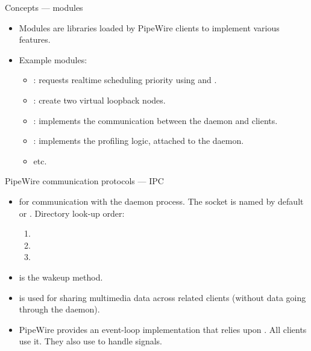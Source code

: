 \begin{frame}{Concepts — modules}
  \begin{itemize}

  \item Modules are libraries loaded by PipeWire clients to implement
    various features.

  \item Example modules:

    \begin{itemize}
    \item {}: requests realtime scheduling priority using
       and .
    \item {}: create two virtual loopback nodes.
    \item {}: implements the communication
      between the daemon and clients.
    \item {}: implements the profiling logic,
      attached to the daemon.
    \item etc.
    \end{itemize}

  \end{itemize}
\end{frame}



\begin{frame}{PipeWire communication protocols — IPC}
  \begin{itemize}

  \item {} for communication with
    the daemon process. The socket is named  by
    default or . Directory look-up order:
    \begin{enumerate}
    \item {}
    \item {}
    \item {}
    \end{enumerate}
  \item {} is the wakeup method.
  \item {} is used for sharing multimedia data
    across related clients (without data going through the daemon).
  \item PipeWire provides an event-loop implementation that relies
    upon . All clients use it. They also use
     to handle signals.

  \end{itemize}
\end{frame}



